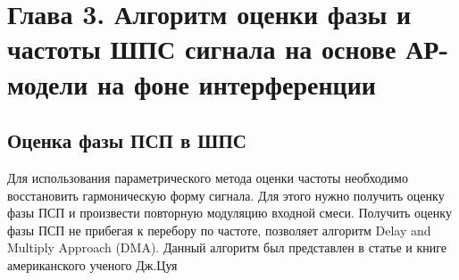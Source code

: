 \section{Глава 3. Алгоритм оценки фазы и частоты ШПС сигнала на основе АР-модели на фоне интерференции}

\subsection{Оценка фазы ПСП в ШПС}
\label{sec_dma_real}
Для использования параметрического метода оценки частоты необходимо восстановить гармоническую форму сигнала. Для этого
нужно получить оценку фазы ПСП и произвести повторную модуляцию входной смеси. Получить оценку фазы ПСП не прибегая к перебору по частоте,
позволяет алгоритм Delay and Multiply Approach (DMA). Данный алгоритм был представлен в статье и книге американского ученого Дж.Цуя \cite{lin_dma, tsui}

